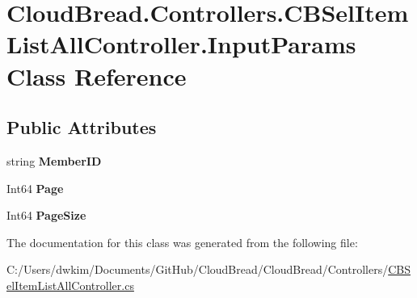 \hypertarget{class_cloud_bread_1_1_controllers_1_1_c_b_sel_item_list_all_controller_1_1_input_params}{}\section{Cloud\+Bread.\+Controllers.\+C\+B\+Sel\+Item\+List\+All\+Controller.\+Input\+Params Class Reference}
\label{class_cloud_bread_1_1_controllers_1_1_c_b_sel_item_list_all_controller_1_1_input_params}
\subsection*{Public Attributes}
\begin{DoxyCompactItemize}
\item 
string {\bfseries Member\+ID}\hypertarget{class_cloud_bread_1_1_controllers_1_1_c_b_sel_item_list_all_controller_1_1_input_params_a689a226c0080a19a73ffad84a4a247e3}{}\label{class_cloud_bread_1_1_controllers_1_1_c_b_sel_item_list_all_controller_1_1_input_params_a689a226c0080a19a73ffad84a4a247e3}

\item 
Int64 {\bfseries Page}\hypertarget{class_cloud_bread_1_1_controllers_1_1_c_b_sel_item_list_all_controller_1_1_input_params_a94caca6ea9144f92df69c8dafb467e8d}{}\label{class_cloud_bread_1_1_controllers_1_1_c_b_sel_item_list_all_controller_1_1_input_params_a94caca6ea9144f92df69c8dafb467e8d}

\item 
Int64 {\bfseries Page\+Size}\hypertarget{class_cloud_bread_1_1_controllers_1_1_c_b_sel_item_list_all_controller_1_1_input_params_a3dceea4c1312f04db711ec16013e8b43}{}\label{class_cloud_bread_1_1_controllers_1_1_c_b_sel_item_list_all_controller_1_1_input_params_a3dceea4c1312f04db711ec16013e8b43}

\end{DoxyCompactItemize}


The documentation for this class was generated from the following file\+:\begin{DoxyCompactItemize}
\item 
C\+:/\+Users/dwkim/\+Documents/\+Git\+Hub/\+Cloud\+Bread/\+Cloud\+Bread/\+Controllers/\hyperlink{_c_b_sel_item_list_all_controller_8cs}{C\+B\+Sel\+Item\+List\+All\+Controller.\+cs}\end{DoxyCompactItemize}
